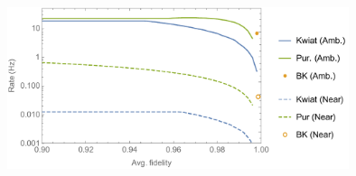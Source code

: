 \documentclass[aps,pra,superscriptaddress,preprint]{revtex4-1}
\begin{document}
\begin{figure}[htbp]
\begin{center}
\includegraphics[width=10.0cm]{FidVsRateFixedDistance.pdf}
\caption{}
\label{fig:FidVsRateFixedDistance}
\end{center}
\end{figure}
\end{document}
